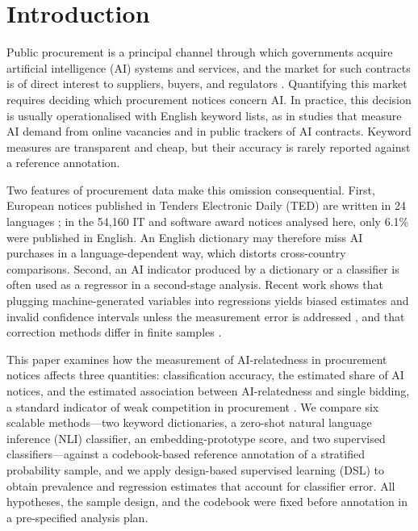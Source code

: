 \section{Introduction}
Public procurement is a principal channel through which governments acquire artificial intelligence (AI) systems and services, and the market for such contracts is of direct interest to suppliers, buyers, and regulators \cite{hickok2022}. Quantifying this market requires deciding which procurement notices concern AI. In practice, this decision is usually operationalised with English keyword lists, as in studies that measure AI demand from online vacancies \cite{acemoglu2022,babina2024} and in public trackers of AI contracts. Keyword measures are transparent and cheap, but their accuracy is rarely reported against a reference annotation.

Two features of procurement data make this omission consequential. First, European notices published in Tenders Electronic Daily (TED) are written in 24 languages \cite{ahmia2018}; in the 54,160 IT and software award notices analysed here, only 6.1\% were published in English. An English dictionary may therefore miss AI purchases in a language-dependent way, which distorts cross-country comparisons. Second, an AI indicator produced by a dictionary or a classifier is often used as a regressor in a second-stage analysis. Recent work shows that plugging machine-generated variables into regressions yields biased estimates and invalid confidence intervals unless the measurement error is addressed \cite{battaglia2025,egami2023}, and that correction methods differ in finite samples \cite{audinet2025}.

This paper examines how the measurement of AI-relatedness in procurement notices affects three quantities: classification accuracy, the estimated share of AI notices, and the estimated association between AI-relatedness and single bidding, a standard indicator of weak competition in procurement \cite{fazekas2016}. We compare six scalable methods---two keyword dictionaries, a zero-shot natural language inference (NLI) classifier, an embedding-prototype score, and two supervised classifiers---against a codebook-based reference annotation of a stratified probability sample, and we apply design-based supervised learning (DSL) \cite{egami2023} to obtain prevalence and regression estimates that account for classifier error. All hypotheses, the sample design, and the codebook were fixed before annotation in a pre-specified analysis plan.

